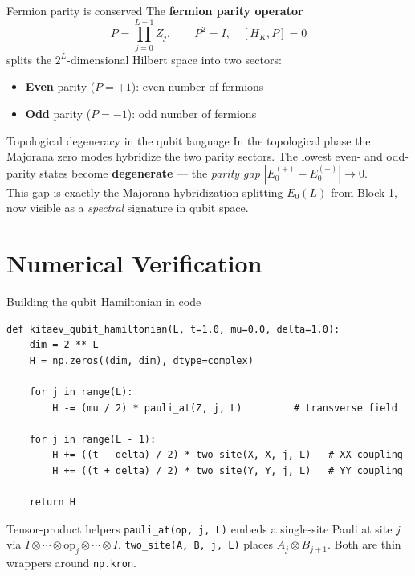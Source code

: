 \documentclass[aspectratio=169, 12pt]{beamer}
\begin{document}
\begin{frame}{Fermion parity is conserved}
  The \textbf{fermion parity operator}
  \begin{equation}
    P = \prod_{j=0}^{L-1} Z_j, \qquad P^2 = I, \quad [H_K, P] = 0
  \end{equation}
  splits the $2^L$-dimensional Hilbert space into two sectors:
  \begin{itemize}
    \item \textbf{Even} parity ($P = +1$): even number of fermions
    \item \textbf{Odd} parity ($P = -1$): odd number of fermions
  \end{itemize}

  \medskip
  \begin{block}{Topological degeneracy in the qubit language}
    In the topological phase the Majorana zero modes hybridize the two parity
    sectors. The lowest even- and odd-parity states become
    \textbf{degenerate} — the \emph{parity gap} $|E_0^{(+)} - E_0^{(-)}| \to 0$.\\[4pt]
    This gap is exactly the Majorana hybridization splitting $E_0(L)$
    from Block 1, now visible as a \emph{spectral} signature in qubit space.
  \end{block}
\end{frame}

\section{Numerical Verification}

\begin{frame}[fragile]{Building the qubit Hamiltonian in code}
  \begin{lstlisting}[basicstyle=\ttfamily\scriptsize]
def kitaev_qubit_hamiltonian(L, t=1.0, mu=0.0, delta=1.0):
    dim = 2 ** L
    H = np.zeros((dim, dim), dtype=complex)

    for j in range(L):
        H -= (mu / 2) * pauli_at(Z, j, L)         # transverse field

    for j in range(L - 1):
        H += ((t - delta) / 2) * two_site(X, X, j, L)   # XX coupling
        H += ((t + delta) / 2) * two_site(Y, Y, j, L)   # YY coupling

    return H
  \end{lstlisting}

  \vspace{-0.5em}
  \begin{block}{Tensor-product helpers}
    \small
    \texttt{pauli\_at(op, j, L)} embeds a single-site Pauli at site $j$ via
    $I \otimes \cdots \otimes \mathrm{op}_j \otimes \cdots \otimes I$.
    \texttt{two\_site(A, B, j, L)} places $A_j \otimes B_{j+1}$.
    Both are thin wrappers around \texttt{np.kron}.
  \end{block}
\end{frame}
\end{document}
